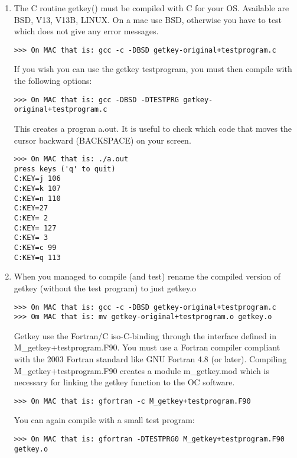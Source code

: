 \documentclass[12pt]{article}
\begin{document}
\begin{enumerate}

\item The C routine getkey() must be compiled with C for your OS.
Available are BSD, V13, V13B, LINUX.  On a mac use BSD, otherwise you
have to test which does not give any error messages.

\begin{verbatim}
>>> On MAC that is: gcc -c -DBSD getkey-original+testprogram.c
\end{verbatim}

If you wish you can use the getkey testprogram, you must then compile
with the following options:

\begin{verbatim}
>>> On MAC that is: gcc -DBSD -DTESTPRG getkey-original+testprogram.c
\end{verbatim}

This creates a progran a.out.  It is useful to check which code that
moves the cursor backward (BACKSPACE) on your screen.

\begin{verbatim}
>>> On MAC that is: ./a.out
press keys ('q' to quit)
C:KEY=j 106
C:KEY=k 107
C:KEY=n 110
C:KEY=27
C:KEY= 2
C:KEY= 127
C:KEY= 3
C:KEY=c 99
C:KEY=q 113
\end{verbatim}

\item When you managed to compile (and test) rename the compiled
version of getkey (without the test program) to just getkey.o

\begin{verbatim}
>>> On MAC that is: gcc -c -DBSD getkey-original+testprogram.c
>>> Om MAC that is: mv getkey-original+testprogram.o getkey.o
\end{verbatim}

Getkey use the Fortran/C iso-C-binding through the interface defined
in M\_getkey+testprogram.F90.  You must use a Fortran compiler
compliant with the 2003 Fortran standard like GNU Fortran 4.8 (or
later).  Compiling M\_getkey+testprogram.F90 creates a module
m\_getkey.mod which is necessary for linking the getkey function to
the OC software.

\begin{verbatim}
>>> On MAC that is: gfortran -c M_getkey+testprogram.F90
\end{verbatim}

You can again compile with a small test program:

\begin{verbatim}
>>> On MAC that is: gfortran -DTESTPRG0 M_getkey+testprogram.F90 getkey.o
\end{verbatim}


\end{enumerate}
\end{document}
